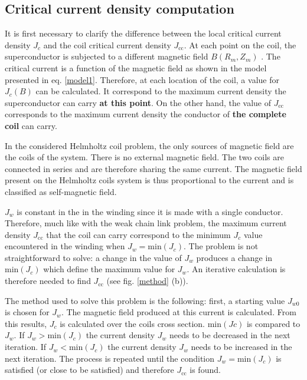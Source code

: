 \documentclass{ws-jmrr}
\begin{document}
\begin{multicols}{2}
\subsection{Critical current density computation}
\label{jccalc}
It is first necessary to clarify the difference between the local critical current density $J_c$ and the coil critical current density $J_{\textrm{cc}}$. At each point on the coil, the superconductor is subjected to a different magnetic field $B(R_m,Z_m)$ \cite{linares2016design}. The critical current is a function of the magnetic field as shown in the model presented in eq. \ref{model1}. Therefore, at each location of the coil, a value for $J_c(B)$ can be calculated. It correspond to the maximum current density the superconductor can carry \textbf{at this point}. On the other hand, the value of $J_{\textrm{cc}}$ corresponds to the maximum current density the conductor of \textbf{the complete coil} can carry.\par
In the considered Helmholtz coil problem, the only sources of magnetic field are the coils of the system. There is no external magnetic field. The two coils are connected in series and are therefore sharing the same current. The magnetic field present on the Helmholtz coils system is thus proportional to the current and is classified as self-magnetic field.\par
$J_w$ is constant in the in the winding since it is made with a single conductor. Therefore, much like with the weak chain link problem, the maximum current density $J_{\textrm{cc}}$ that the coil can carry correspond to the minimum $J_c$ value encountered in the winding when $J_w=\textrm{min}(J_c)$. The problem is not straightforward to solve: a change in the value of $J_w$ produces a change in $\textrm{min}(J_c)$ which define the maximum value for $J_w$. An iterative calculation is therefore needed to find $J_{\textrm{cc}}$ (see fig. \ref{method} (b)).\par
The method used to solve this problem is the following: first, a starting value $J_{w0}$ is chosen for $J_{w}$. The magnetic field produced at this current is calculated. From this results, $J_c$ is calculated over the coils cross section. $\textrm{min}(Jc)$ is compared to $J_w$. If $J_w>\textrm{min}(J_c)$ the current density $J_w$ needs to be decreased in the next iteration. If $J_w<\textrm{min}(J_c)$ the current density $J_w$ needs to be increased in the next iteration. The process is repeated until the condition $J_w=\textrm{min}(J_c)$ is satisfied (or close to be satisfied) and therefore $J_{\textrm{cc}}$ is found.\par

\end{multicols}
\end{document}
